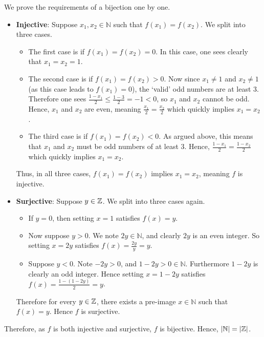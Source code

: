 \begin{questions}
    \item We prove the requirements of a bijection one by one.
    \begin{itemize}
        \item \textbf{Injective}: Suppose $x_1, x_2 \in \mathbb{N}$ such that $f(x_1) = f(x_2)$. We split into three cases.
        \begin{itemize}
            \item The first case is if $f(x_1) = f(x_2) = 0$. In this case, one sees clearly that $x_1 = x_2 = 1$.
            \item The second case is if $f(x_1) = f(x_2) > 0$. Now since $x_1 \neq 1$ and $x_2 \neq 1$ (as this case leads to $f(x_1) = 0$), the `valid' odd numbers are at least 3. Therefore one sees $\frac{1-x_1}{2} \leq \frac{1-3}{2} = -1 < 0$, so $x_1$ and $x_2$ cannot be odd. Hence, $x_1$ and $x_2$ are even, meaning $\frac{x_1}{2} = \frac{x_2}{2}$ which quickly implies $x_1 = x_2$.
            \item The third case is if $f(x_1) = f(x_2) < 0$. As argued above, this means that $x_1$ and $x_2$ must be odd numbers of at least 3. Hence, $\frac{1-x_1}{2} = \frac{1-x_2}{2}$ which quickly implies $x_1 = x_2$.
        \end{itemize}
        Thus, in all three cases, $f(x_1) = f(x_2)$ implies $x_1 = x_2$, meaning $f$ is injective.
        \item \textbf{Surjective}: Suppose $y \in \mathbb{Z}$. We split into three cases again.
        \begin{itemize}
            \item If $y = 0$, then setting $x = 1$ satisfies $f(x) = y$.
            \item Now suppose $y > 0$. We note $2y \in \mathbb{N}$, and clearly $2y$ is an even integer. So setting $x = 2y$ satisfies $f(x) = \frac{2y}{y} = y$.
            \item Suppose $y < 0$. Note $-2y > 0$, and $1 - 2y > 0 \in \mathbb{N}$. Furthermore $1 - 2y$ is clearly an odd integer. Hence setting $x = 1 - 2y$ satisfies $f(x) = \frac{1-(1-2y)}{2} = y$.
        \end{itemize}
        Therefore for every $y \in \mathbb{Z}$, there exists a pre-image $x \in \mathbb{N}$ such that $f(x) = y$. Hence $f$ is surjective.
    \end{itemize}
    Therefore, as $f$ is both injective and surjective, $f$ is bijective. Hence, $|\mathbb{N}| = |\mathbb{Z}|$.
\end{questions}

